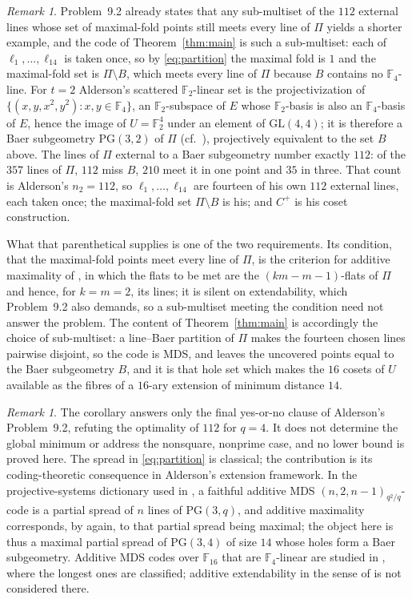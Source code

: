 \documentclass[11pt]{amsart}
\theoremstyle{remark}
\newtheorem{remark}[theorem]{Remark}
\newcommand{\F}{\mathbb F}
\newcommand{\PG}{\mathrm{PG}}
\begin{document}
\begin{remark}\label{rem:relation}
Problem~9.2 already states that any sub-multiset of the $112$ external
lines whose set of maximal-fold points still meets every line of $\Pi$
yields a shorter example, and the code of Theorem~\ref{thm:main} is such a
sub-multiset: each of $\ell_1,\ldots,\ell_{14}$ is taken once, so by
\eqref{eq:partition} the maximal fold is $1$ and the maximal-fold set is
$\Pi\setminus B$, which meets every line of $\Pi$ because $B$ contains no
$\F_4$-line. For $t=2$ Alderson's scattered $\F_2$-linear set is the
projectivization of $\{(x,y,x^2,y^2):x,y\in\F_4\}$, an $\F_2$-subspace of
$E$ whose $\F_2$-basis is also an $\F_4$-basis of $E$, hence the image of $U=\F_2^4$
under an element of $\mathrm{GL}(4,4)$; it is therefore a Baer subgeometry
$\PG(3,2)$ of $\Pi$ (cf.\ \cite[Lemma~6.4]{Alderson}), projectively
equivalent to the set $B$ above. The lines of $\Pi$ external to a Baer
subgeometry number exactly
$112$: of the $357$ lines of $\Pi$, $112$ miss $B$, $210$ meet it in one
point and $35$ in three. That count is Alderson's $n_2=112$, so
$\ell_1,\ldots,\ell_{14}$ are fourteen of his own $112$ external lines, each
taken once; the maximal-fold set $\Pi\setminus B$ is his; and $C^+$ is his
coset construction.

What that parenthetical supplies is one of the two requirements. Its
condition, that the maximal-fold points meet every line of $\Pi$, is the
criterion for additive maximality of \cite[Corollary~3.6]{Alderson}, in which
the flats to be met are the $(km-m-1)$-flats of $\Pi$ and hence, for
$k=m=2$, its lines; it is silent on extendability, which Problem~9.2 also
demands, so a sub-multiset meeting the condition need not answer the problem. The content of
Theorem~\ref{thm:main} is accordingly the choice of sub-multiset: a
line--Baer partition of $\Pi$ makes the fourteen chosen lines pairwise
disjoint, so the code is MDS, and leaves the uncovered points equal to the
Baer subgeometry $B$, and it is that hole set which makes the $16$ cosets of
$U$ available as the fibres of a $16$-ary extension of minimum distance
$14$.
\end{remark}

\begin{remark}
The corollary answers only the final yes-or-no clause of Alderson's
Problem~9.2, refuting the optimality of $112$ for $q=4$. It does not
determine the global minimum or address the nonsquare, nonprime case, and no
lower bound is proved here. The spread in \eqref{eq:partition} is classical;
the contribution is its coding-theoretic consequence in Alderson's extension
framework. In the projective-systems dictionary used in \cite{Alderson}, a
faithful additive MDS $(n,2,n-1)_{q^2/q}$-code is a partial spread of $n$
lines of $\PG(3,q)$, and additive maximality corresponds, by
\cite[Corollary~3.6]{Alderson} again, to that partial spread being maximal; the object here is thus a
maximal partial spread of $\PG(3,4)$ of size $14$ whose holes form a Baer
subgeometry. Additive MDS codes over $\F_{16}$ that are $\F_4$-linear are
studied in \cite{BGL}, where the longest ones are classified; additive
extendability in the sense of \cite{Alderson} is not considered there.
\end{remark}
\end{document}
